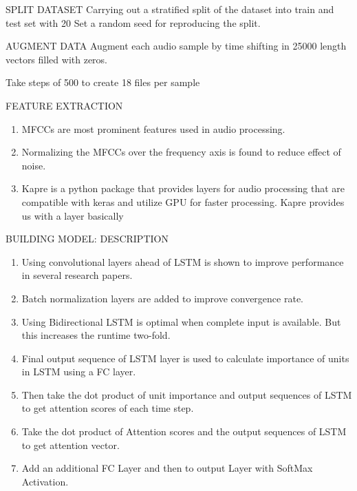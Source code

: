 \documentclass[11pt]{beamer}
\begin{document}
\begin{frame}
{SPLIT DATASET}
Carrying out a stratified split of the dataset into train and test set with 20%
Set a random seed for reproducing the split.
\end{frame}


\begin{frame}
{AUGMENT DATA}
Augment each audio sample by time shifting in 25000 length vectors filled with zeros.

Take steps of 500 to create 18 files per sample
\end{frame}


\begin{frame}
{FEATURE EXTRACTION}
\begin{enumerate}
    \item MFCCs are most prominent features used in audio processing.
    \item Normalizing the MFCCs over the frequency axis is found to reduce effect of noise.
    \item Kapre is a python package that provides layers for audio processing that are compatible with keras and utilize GPU for faster processing. Kapre provides us with a layer basically
\end{enumerate}



\end{frame}




\begin{frame}
{BUILDING MODEL: DESCRIPTION}
\begin{enumerate}
    \item Using convolutional layers ahead of LSTM is shown to improve performance in several research papers.
    \item Batch normalization layers are added to improve convergence rate.
    \item Using Bidirectional LSTM is optimal when complete input is available. But this increases the runtime two-fold.
    \item Final output sequence of LSTM layer is used to calculate importance of units in LSTM using a FC layer.
    \item Then take the dot product of unit importance and output sequences of LSTM to get attention scores of each time step.
    \item Take the dot product of Attention scores and the output sequences of LSTM to get attention vector.
    \item Add an additional FC Layer and then to output Layer with SoftMax Activation.
\end{enumerate}
\end{frame}
\end{document}
